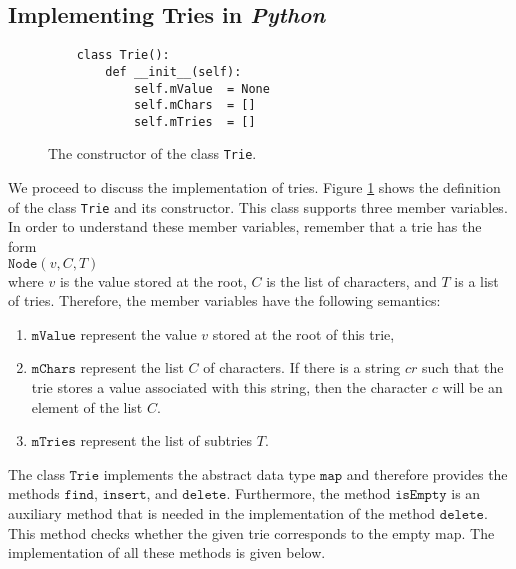 \subsection{Implementing Tries in \textsl{Python}}
\begin{figure}[!ht]
\centering
\begin{verbatim}
    class Trie(): 
        def __init__(self):
            self.mValue  = None
            self.mChars  = []
            self.mTries  = []
\end{verbatim}
\vspace*{-0.3cm}
\caption{The constructor of the class \texttt{Trie}.}
\label{fig:trie.ipython-outline}
\end{figure}

\noindent
We proceed to discuss the implementation of tries.  Figure \ref{fig:trie.ipython-outline} shows the
definition of the class \texttt{Trie} and its constructor.  This class supports three member variables.  In order to
understand these member variables, remember that a trie has the form
\\[0.2cm]
\hspace*{1.3cm}
$\texttt{Node}(v, C, T)$
\\[0.2cm]
where $v$ is the value stored at the root, $C$ is the list of characters, and $T$ is a list of
tries.  Therefore, the member variables have the following semantics:
\begin{enumerate}
\item $\texttt{mValue}$ represent the value $v$ stored at the root of this trie,  
\item $\texttt{mChars}$ represent the list  $C$ of characters.  If there is a string $cr$ such that
      the trie stores a value associated with this string, then the character $c$ will be an element of
      the list $C$.
\item $\texttt{mTries}$ represent the list of subtries $T$.  
\end{enumerate}
The class $\texttt{Trie}$ implements the abstract data type $\texttt{map}$ and therefore provides the
methods $\texttt{find}$, $\texttt{insert}$, and $\texttt{delete}$.  Furthermore, the method
$\texttt{isEmpty}$ is an auxiliary method that is needed in the implementation of the method 
$\texttt{delete}$.  This method checks whether the given trie corresponds to the empty map.  The
implementation of all these methods is given below. 

